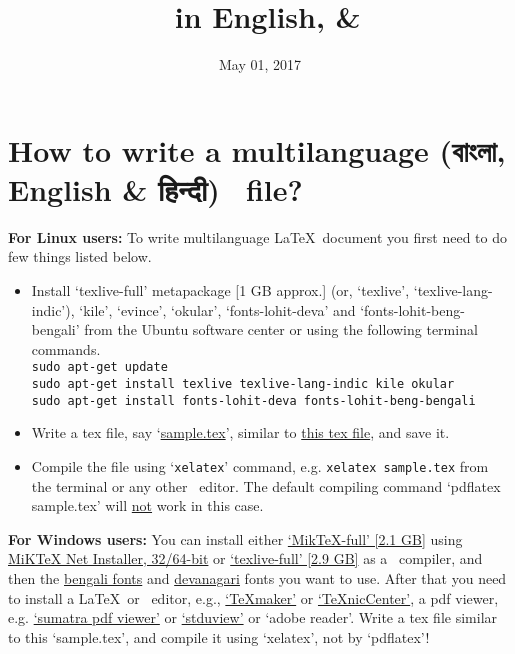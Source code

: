 \documentclass[12pt,reqno]{article}
\title{\XeLaTeX \, in English, \bngn{বাংলা} \& \hnd{हिन्दी}}
\author{\href{www.math.tifr.res.in/~apmath90/index.html}{\bngn{অর্জুন পাল}}}
\date{May 01, 2017}
\newcommand\bngn {\textbengali} %
\newcommand\hnd {\textsanskrit}
\theoremstyle{plain}
\numberwithin{equation}{section}
\begin{document}
\maketitle
\tableofcontents
\section{How to write a multilanguage (\bngn{বাংলা}, English \& \hnd{हिन्दी}) \XeLaTeX \, file?}
\textbf{For Linux users:}
To write multilanguage \LaTeX \, document you first need to do few things listed below.
\begin{itemize}
 \item Install `texlive-full' metapackage [1 GB approx.] (or, `texlive', `texlive-lang-indic'), `kile', `evince', `okular', `fonts-lohit-deva' and `fonts-lohit-beng-bengali' from the Ubuntu software center or using the following terminal commands. \\
 \texttt{sudo apt-get update \\ sudo apt-get install texlive texlive-lang-indic kile okular \\ sudo apt-get install fonts-lohit-deva fonts-lohit-beng-bengali}

 \item Write a tex file, say `\href{http://www.math.tifr.res.in/~apmath90/Bengali/sample.tex}{sample.tex}', similar to \href{http://www.math.tifr.res.in/~apmath90/Bengali/sample.tex.pdf}{this tex file}, and save it.
 \item Compile the file using `\texttt{xelatex}' command, e.g. \texttt{xelatex sample.tex} from the terminal or any other \XeLaTeX\, editor. The default compiling command `pdflatex sample.tex' will \underline{not} work in this case.
\end{itemize}
\noindent
\textbf{For Windows users:} You can install either \href{https://drive.google.com/file/d/0B5z0PYQChDCvZkNidGw1V1l3cVU/view?usp=sharing}{`MikTeX-full' [2.1 GB]} using \href{http://www.miktex.org/download}{MiKTeX Net Installer, 32/64-bit} or \href{http://ctan.imsc.res.in/systems/texlive/Images/texlive2016-20160523.iso}{`texlive-full' [2.9 GB]} as a \XeLaTeX \, compiler, and then the \href{http://www.fontsc.com/font/lohit-bengali}{bengali fonts} and \href{http://www.fontsc.com/font/lohit-devanagari}{devanagari} fonts you want to use. After that you need to install a \LaTeX \, or \XeLaTeX \, editor, e.g., \href{http://www.xm1math.net/texmaker/}{`TeXmaker'} or \href{http://www.texniccenter.org/}{`TeXnicCenter'}, a pdf viewer, e.g. \href{https://www.sumatrapdfreader.org/free-pdf-reader.html}{`sumatra pdf viewer'} or \href{http://stdutility.com/stduviewer.html}{`stduview'} or `adobe reader'. Write a tex file similar to this `sample.tex', and compile it using `xelatex', not by `pdflatex'!
\end{document}
